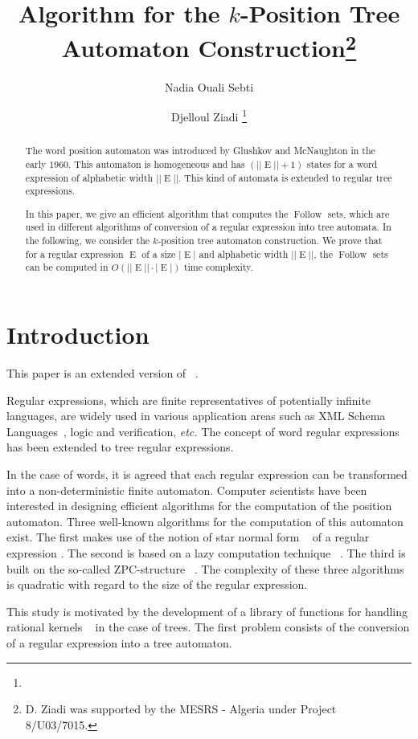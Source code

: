\documentclass{llncs}
\title{Algorithm for the $k$-Position Tree Automaton Construction\thanks{D. Ziadi was supported by the MESRS - Algeria under Project 8/U03/7015.}}
\author{Nadia Ouali Sebti \and Djelloul Ziadi \thanks{\email{$\{$Nadia.Ouali-Sebti, Djelloul.Ziadi$\}$@univ-rouen.fr}}}
\institute{Laboratoire LITIS - EA 4108 Universit\'e de Rouen, Avenue de l'Universit\'e \\76801 Saint-\'Etienne-du-Rouvray Cedex.}
\date{}
\DeclareMathOperator{\Follow}{Follow}
\DeclareMathOperator{\E}{E}
\begin{document}
\setcounter{footnote}{0}
\maketitle             
\begin{abstract}
The word position automaton was introduced by Glushkov and McNaughton in the early $1960$. This automaton
is homogeneous and has $(||\E||+1)$ states for a word expression of alphabetic width $||\E||$.
This kind of automata is extended to regular tree expressions.

In this paper, we give an efficient algorithm that computes the $\Follow$ sets, which are used in different algorithms of conversion of a regular expression into tree automata. In the following, we consider the $k$-position tree automaton construction. We prove that for a regular expression $\E$ of a size $|\E|$ and alphabetic width $||\E||$, the $\Follow$ sets can be computed in $O(||\E||\cdot |\E|)$ time complexity.   
\end{abstract}
\section{Introduction}

This paper is an extended version of ~\cite{Ouali}.

Regular expressions, which are finite representatives of potentially infinite languages, are widely used in various application areas such as XML Schema Languages~\cite{xml}, logic and verification, \emph{etc.} The concept of word regular expressions  has been extended to tree regular expressions. 


 In the case of words, it is agreed that each regular expression can be transformed into a non-deterministic finite automaton.
Computer scientists have been interested in designing efficient algorithms for the computation of the position automaton. 
Three well-known algorithms for the computation of this automaton exist. The first makes use 
of the notion of star normal form ~\cite{Brug} of a regular expression   . The second is based on a
lazy computation technique ~\cite{Paig}. The third is built on the so-called ZPC-structure ~\cite{ZPC}.
The complexity of these three algorithms is quadratic with regard to the size of the regular expression.


This study is motivated by the development of a library of functions for handling rational kernels ~\cite{mohri1} in the case of trees. The first problem consists of the conversion of a regular expression into a tree automaton. 
\end{document}
